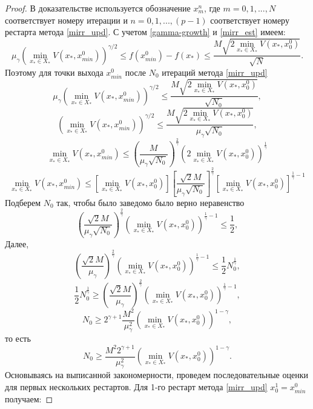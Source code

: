     \begin{proof}
        В доказательстве используется обозначение $x_m^n$, где $m = 0,1,...,N$ соответствует номеру итерации и $n = 0,1,...,(p-1)$ соответствует номеру рестарта метода \eqref{mirr_upd}. С учетом \eqref{gamma-growth} и \eqref{mirr_est} имеем: 
        $$
            \mu_{\gamma}\left(\min\limits_{x_* \in X_*}{V(x_*, x_{min}^0)}\right)^{\gamma/2} \leq f(x_{min}^0) - f(x_*) \leq \frac{M\sqrt{2 \min\limits_{x_* \in X_*}{V(x_*, x_0^0)}}}{\sqrt{N}}.
        $$
        Поэтому для точки выхода $x_{min}^0$ после $N_0$ итераций метода \eqref{mirr_upd}
        $$
            \mu_{\gamma}\left(\min\limits_{x_* \in X_*}{V(x_*, x_{min}^0)}\right)^{\gamma/2} \leq \frac{M\sqrt{2\min\limits_{x_* \in X_*}{V(x_*, x_0^0)}}}{\sqrt{N_0}},
        $$
        $$
            \left(\min\limits_{x_* \in X_*}{V(x_*, x_{min}^0)}\right)^{\gamma/2} \leq \frac{M\sqrt{2\min\limits_{x_* \in X_*}{V(x_*, x_0^0)}}}{\mu_{\gamma}\sqrt{N_0}},
        $$
        $$
            \min\limits_{x_* \in X_*}{V(x_*, x_{min}^0)} \leq \left(\frac{M}{\mu_{\gamma}\sqrt{N_0}}\right)^{\frac{2}{\gamma}} \left(2\min\limits_{x_* \in X_*}{V(x_*, x_0^0)}\right)^{\frac{1}{\gamma}}
        $$
        $$
            \min\limits_{x_* \in X_*}{V(x_*, x_{min}^0)} \leq \left[\min\limits_{x_* \in X_*}{V(x_*, x_0^0)} \right] \left[\frac{\sqrt{2}M}{\mu_{\gamma}\sqrt{N_0}}\right]^{\frac{2}{\gamma}} \left[\min\limits_{x_* \in X_*}{V(x_*, x_0^0)}\right]^{\frac{1}{\gamma} - 1}
        $$
        Подберем $N_0$ так, чтобы было заведомо было верно неравенство
        $$
            \left(\frac{\sqrt{2}M}{\mu_{\gamma}\sqrt{N_0}}\right)^{\frac{2}{\gamma}} \left(\min\limits_{x_* \in X_*}{V(x_*, x_0^0)}\right)^{\frac{1}{\gamma} - 1} \leq \frac{1}{2}, 
        $$
        Далее,
        $$
            \left(\frac{\sqrt{2}M}{\mu_{\gamma}}\right)^{\frac{2}{\gamma}} \left(\min\limits_{x_* \in X_*}{V(x_*, x_0^0)}\right)^{\frac{1}{\gamma} - 1} \leq \frac{1}{2} N_0^{\frac{1}{\gamma}}, 
        $$
        $$
            \frac{1}{2} N_0^{\frac{1}{\gamma}} \geq \left(\frac{\sqrt{2}M}{\mu_{\gamma}}\right)^{\frac{2}{\gamma}} \left(\min\limits_{x_* \in X_*}{V(x_*, x_0^0)}\right)^{\frac{1}{\gamma} - 1},  
        $$
        $$
            N_0 \geq 2 ^ {\gamma + 1} \frac{M^2}{\mu_{\gamma}^2} \left(\min\limits_{x_* \in X_*}{V(x_*, x_0^0)}\right)^{1 - \gamma},
        $$
        то есть
        $$
            N_0 \geq \frac{M^2 2^{\gamma + 1}}{\mu_{\gamma}^2} \left(\min\limits_{x_* \in X_*}{V(x_*, x_0^0)}\right)^{1 - \gamma}.  
        $$
        Основываясь на выписанной закономерности, проведем последовательные оценки для первых нескольких рестартов. Для 1-го рестарт метода \eqref{mirr_upd} $x_0^1 = x_{min}^0$ получаем:

\end{proof}
